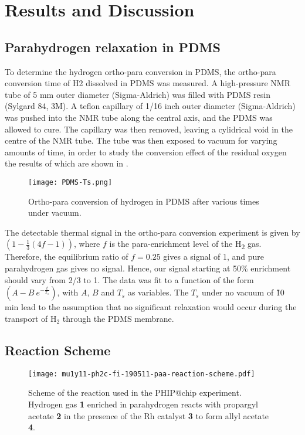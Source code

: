 \section{Results and Discussion}

\subsection{Parahydrogen relaxation in PDMS}

To determine the hydrogen ortho-para
conversion in PDMS, the ortho-para conversion time of H2 dissolved in PDMS
was measured. A high-pressure NMR tube of 5 mm outer diameter
(Sigma-Aldrich) was filled with PDMS resin (Sylgard 84, 3M). A teflon
capillary of 1/16 inch outer diameter (Sigma-Aldrich) was pushed
into the NMR tube along the central axis, and the PDMS was allowed to cure.
The capillary was then removed, leaving a cylidrical void in the centre of
the NMR tube. The tube was then exposed to vacuum for varying amounts of
time, in order to study the conversion effect of the residual oxygen the
results of which are shown in .

\begin{figure}[h]
  \texttt{[image: PDMS-Ts.png]}
  \caption{Ortho-para conversion of hydrogen in PDMS after various times
  under vacuum.}
  \label{fig:ph2conv}
\end{figure}

The detectable thermal signal in the ortho-para conversion experiment is
given by
$(1 - \frac{1}{3}\left( 4f - 1 \right))$,
where $f$ is the
para-enrichment level of the H\textsubscript{2} gas.
Therefore, the equilibrium ratio of
$f = 0.25$ gives a signal of 1, and pure parahydrogen gas gives no
signal. Hence, our signal starting at 50\% enrichment should vary from
2/3 to 1.
The data was fit to a function of the form
$(A - B\ e^{- \frac{t}{T_{s}}})$, with $A$, $B$ and $T_{s}$ as
variables.
The $T_s$ under no vacuum of \~10 min lead to the assumption that no significant
relaxation would occur during the transport of H$_2$ through the PDMS membrane.

\subsection{Reaction Scheme}

\begin{figure*}[h]
  \centering
  \texttt{[image: mu1y11-ph2c-fi-190511-paa-reaction-scheme.pdf]}
  \caption{
    Scheme of the reaction used in the PHIP@chip experiment. Hydrogen gas
    \textbf{1}
    enriched in parahydrogen reacts with propargyl acetate \textbf{2} in
    the presence of the Rh catalyst \textbf{3} to form allyl acetate \textbf{4}.
  }
  \label{fig:reaction-scheme}
\end{figure*}

